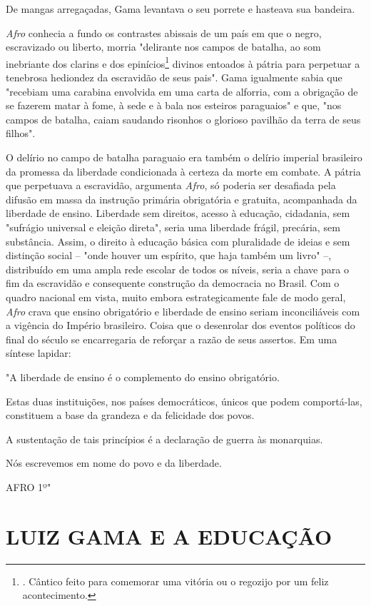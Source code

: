 De mangas arregaçadas, Gama levantava o seu porrete e hasteava sua
bandeira.

\emph{Afro} conhecia a fundo os contrastes abissais de um país em que o
negro, escravizado ou liberto, morria "delirante nos campos de batalha,
ao som inebriante dos clarins e dos epinícios\footnote{. Cântico feito
  para comemorar uma vitória ou o regozijo por um feliz acontecimento.}
divinos entoados à pátria para perpetuar a tenebrosa hediondez da
escravidão de seus pais". Gama igualmente sabia que "recebiam uma
carabina envolvida em uma carta de alforria, com a obrigação de se
fazerem matar à fome, à sede e à bala nos esteiros paraguaios" e que,
"nos campos de batalha, caiam saudando risonhos o glorioso pavilhão da
terra de seus filhos".

O delírio no campo de batalha paraguaio era também o delírio imperial
brasileiro da promessa da liberdade condicionada à certeza da morte em
combate. A pátria que perpetuava a escravidão, argumenta \emph{Afro}, só
poderia ser desafiada pela difusão em massa da instrução primária
obrigatória e gratuita, acompanhada da liberdade de ensino. Liberdade
sem direitos, acesso à educação, cidadania, sem "sufrágio universal e
eleição direta", seria uma liberdade frágil, precária, sem substância.
Assim, o direito à educação básica com pluralidade de ideias e sem
distinção social -- "onde houver um espírito, que haja também um livro"
--, distribuído em uma ampla rede escolar de todos os níveis, seria a
chave para o fim da escravidão e consequente construção da democracia no
Brasil. Com o quadro nacional em vista, muito embora estrategicamente
fale de modo geral, \emph{Afro} crava que ensino obrigatório e liberdade
de ensino seriam inconciliáveis com a vigência do Império brasileiro.
Coisa que o desenrolar dos eventos políticos do final do século se
encarregaria de reforçar a razão de seus assertos. Em uma síntese
lapidar:

"A liberdade de ensino é o complemento do ensino obrigatório.

Estas duas instituições, nos países democráticos, únicos que podem
comportá-las, constituem a base da grandeza e da felicidade dos povos.

A sustentação de tais princípios é a declaração de guerra às monarquias.

Nós escrevemos em nome do povo e da liberdade.

AFRO 1º"

\section{LUIZ GAMA E A EDUCAÇÃO}

